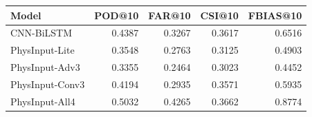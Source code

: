 \begin{tabular}{lrrrr}
\toprule
          Model &  POD@10 &  FAR@10 &  CSI@10 &  FBIAS@10 \\
\midrule
     CNN-BiLSTM &  0.4387 &  0.3267 &  0.3617 &    0.6516 \\
 PhysInput-Lite &  0.3548 &  0.2763 &  0.3125 &    0.4903 \\
 PhysInput-Adv3 &  0.3355 &  0.2464 &  0.3023 &    0.4452 \\
PhysInput-Conv3 &  0.4194 &  0.2935 &  0.3571 &    0.5935 \\
 PhysInput-All4 &  0.5032 &  0.4265 &  0.3662 &    0.8774 \\
\bottomrule
\end{tabular}
